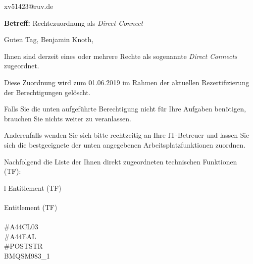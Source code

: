 \documentclass[a4paper,landscape,12pt]{letter}
\begin{document}
\begin{letter}{xv51423@ruv.de\hfill \break}
\begin{normalsize}
	\opening{\textbf{Betreff:} Rechtezuordnung als \emph{Direct Connect}}
	\begin{normalsize} \hfill
	\end{normalsize}

	\begin{normalsize}
		Guten Tag, 
	Benjamin Knoth, \hfill \break
	\end{normalsize}
	\end{normalsize}
	
\begin{normalsize}
	Ihnen sind derzeit eines oder mehrere Rechte als sogenannte \emph{Direct Connects} zugeordnet.
	
	Diese Zuordnung wird zum 01.06.2019 im Rahmen der aktuellen Rezertifizierung der Berechtigungen gelöscht.
	
	Falls Sie die unten aufgeführte Berechtigung nicht für Ihre Aufgaben benötigen, 
	brauchen Sie nichts weiter zu veranlassen.
	
	Anderenfalls wenden Sie sich bitte rechtzeitig an Ihre IT-Betreuer 
	und lassen Sie sich die bestgeeignete der unten angegebenen Arbeitsplatzfunktionen zuordnen.
	\end{normalsize}
	
\begin{normalsize}
	Nachfolgend die Liste der Ihnen direkt zugeordneten technischen Funktionen (TF):

	\begin{longtable}{l}
		Entitlement (TF) \\ \hline
		\endfirsthead
		\\\hline
		Entitlement (TF) \\ \hline
		\endhead %
		\multicolumn{1}{r@{}}{Fortsetzung \ldots}\\
		\endfoot
		\hline
		\endlastfoot
	\#A44CL03\\\#A44EAL\\\#POSTSTR\\BMQSM983\_1\\
	\end{longtable}
	\end{normalsize}
	

\end{letter}
\end{document}
